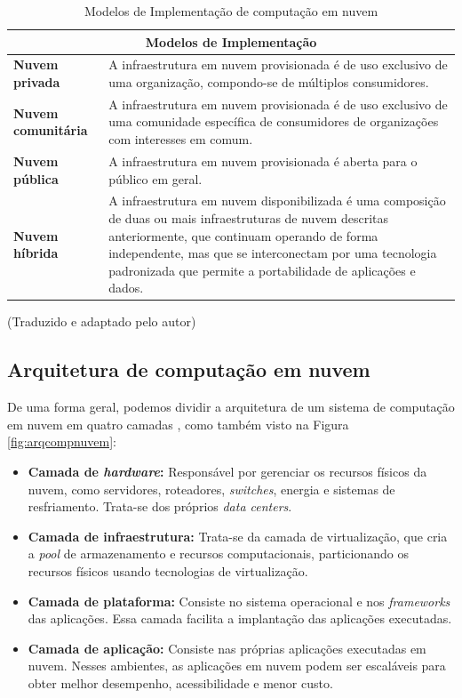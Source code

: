 \documentclass[
	12pt,				%
	oneside,			%
	a4paper,			%
	chapter=TITLE,		%
	english,			%
	french,				%
	spanish,			%
	brazil				%
	]{abntex2}
\begin{document}
\begin{table}[ht]
\ABNTEXchapterfont
\centering

\caption{Modelos de Implementação de computação em nuvem}
\begin{tabular}{|m{3.8cm}|m{11.0cm}|}
    \hline
    \multicolumn{2}{|c|}{\centering\textbf{Modelos de Implementação}}\\
    \hline
    \hline
	\centering\textbf{Nuvem privada} & A infraestrutura em nuvem provisionada é de uso exclusivo de uma organização, compondo-se de múltiplos consumidores. \\
	\hline
	\centering\textbf{Nuvem comunitária} & A infraestrutura em nuvem provisionada é de uso exclusivo de uma comunidade específica de consumidores de organizações com interesses em comum.\\
	\hline
	\centering\textbf{Nuvem pública} & A infraestrutura em nuvem provisionada é aberta para o público em geral.\\
	\hline
	\centering\textbf{Nuvem híbrida} & A infraestrutura em nuvem disponibilizada é uma composição de duas ou mais infraestruturas de nuvem descritas anteriormente, que continuam operando de forma independente, mas que se interconectam por uma tecnologia padronizada que permite a portabilidade de aplicações e dados.\\
	\hline
	\end{tabular}
	\textual (Traduzido e adaptado pelo autor)
	\label{tab:modelos}
\end{table}


\subsection{Arquitetura de computação em nuvem}\label{sec_arq_comp}

De uma forma geral, podemos dividir a arquitetura de um sistema de computação em nuvem em quatro camadas \cite{zhang2010cloud}, como também visto na Figura \ref{fig:arqcompnuvem}:

\begin{itemize}
    \item \textbf{Camada de \emph{hardware}:} Responsável por gerenciar os recursos físicos da nuvem, como servidores, roteadores, \emph{switches}, energia e sistemas de resfriamento. Trata-se dos próprios \emph{data centers}.
    \item \textbf{Camada de infraestrutura:} Trata-se da camada de virtualização, que cria a \emph{pool} de armazenamento e recursos computacionais, particionando os recursos físicos usando tecnologias de virtualização.
    \item \textbf{Camada de plataforma:} Consiste no sistema operacional e nos \emph{frameworks} das aplicações. Essa camada facilita a implantação das aplicações executadas.
    \item \textbf{Camada de aplicação:} Consiste nas próprias aplicações executadas em nuvem. Nesses ambientes, as aplicações em nuvem podem ser escaláveis para obter melhor desempenho, acessibilidade e menor custo.
\end{itemize}
\end{document}
